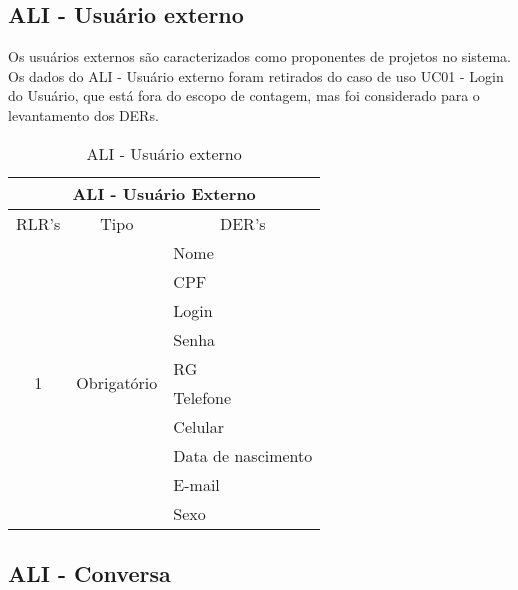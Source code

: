   
  \subsection{ALI - Usuário externo}
    
    Os usuários externos são caracterizados como proponentes de projetos no sistema.
    Os dados do ALI - Usuário externo foram retirados do caso de uso UC01 - Login do Usuário, que está fora do escopo 
    de contagem, mas foi considerado para o levantamento dos DERs.
    
    \begin{table}[!h]
    \centering
    \caption{ALI - Usuário externo}
    \label{ali_usuario_externo}
    \begin{tabular}{|c|c|l|}
    \hline
    \multicolumn{3}{|c|}{ALI - Usuário Externo}                                              \\ \hline
    \multicolumn{1}{|l|}{RLR's} & Tipo                          & \multicolumn{1}{c|}{DER's} \\ \hline
    \multirow{10}{*}{1}         & \multirow{10}{*}{Obrigatório} & Nome                       \\ \cline{3-3} 
				&                               & CPF                        \\ \cline{3-3} 
				&                               & Login                      \\ \cline{3-3} 
				&                               & Senha                      \\ \cline{3-3} 
				&                               & RG                         \\ \cline{3-3} 
				&                               & Telefone                   \\ \cline{3-3} 
				&                               & Celular                    \\ \cline{3-3} 
				&                               & Data de nascimento         \\ \cline{3-3} 
				&                               & E-mail                     \\ \cline{3-3} 
				&                               & Sexo                       \\ \hline
    \end{tabular}
    \end{table}
    
      \subsection{ALI - Conversa}
    

